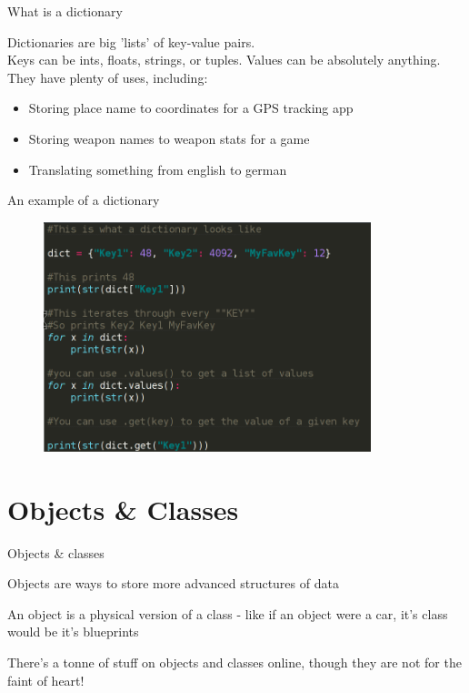 \documentclass{beamer}
\begin{document}
\begin{frame}{What is a dictionary}

Dictionaries are big 'lists' of key-value pairs.\\ \pause
Keys can be ints, floats, strings, or tuples. Values can be absolutely anything.\\ \pause
They have plenty of uses, including:

  \begin{itemize}
  \item Storing place name to coordinates for a GPS tracking app\pause
  \item Storing weapon names to weapon stats for a game\pause
  \item Translating something from english to german
  \end{itemize}

\end{frame}

\begin{frame}{An example of a dictionary}

\begin{figure}[h]
\includegraphics[width=0.85\textwidth]{dict}
\end{figure}

\end{frame}

\section{Objects \& Classes}

\begin{frame}{Objects \& classes}

Objects are ways to store more advanced structures of data\\ \pause

An object is a physical version of a class - like if an object were a car, it's class would be it's blueprints\\ \pause

There's a tonne of stuff on objects and classes online, though they are not for the faint of heart!

\end{frame}
\end{document}
